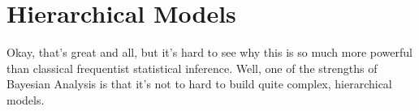 \documentclass[12pt]{book}
\begin{document}
%
%
%
%
%
%
%



\section{Hierarchical Models}

Okay, that's great and all, but it's hard to see why this is so much more powerful than classical frequentist statistical inference. Well, one of the strengths of Bayesian Analysis is that it's not to hard to build quite complex, hierarchical models.
\end{document}
